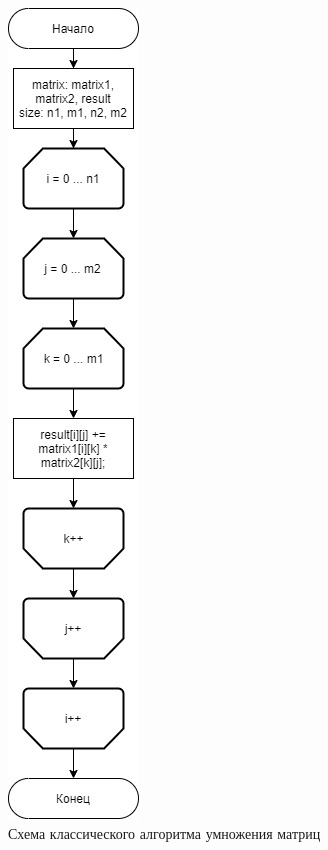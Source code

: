 \documentclass[12pt]{report}
\begin{document}
\begin{figure}[pt]
\centering
\includegraphics[scale=0.6]{alg1.jpg}
\caption{Схема классического алгоритма умножения матриц}
\label{fig:mpr}
\end{figure}
\end{document}
